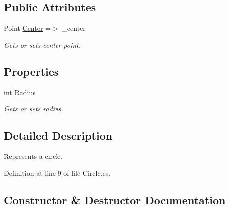 \subsection*{Public Attributes}
\begin{DoxyCompactItemize}
\item 
Point \mbox{\hyperlink{class_test_project_1_1_task_library_1_1_tasks_1_1_lesson6_1_1_models_1_1_circle_a459f59c96a830851a5a17e1efb26197d}{Center}} =$>$ \+\_\+center
\begin{DoxyCompactList}\small\item\em Gets or sets center point. \end{DoxyCompactList}\end{DoxyCompactItemize}
\subsection*{Properties}
\begin{DoxyCompactItemize}
\item 
int \mbox{\hyperlink{class_test_project_1_1_task_library_1_1_tasks_1_1_lesson6_1_1_models_1_1_circle_aaa90ca9c05259731fb2c3684b9feb3bd}{Radius}}
\begin{DoxyCompactList}\small\item\em Gets or sets radius. \end{DoxyCompactList}\end{DoxyCompactItemize}


\subsection{Detailed Description}
Represents a circle. 



Definition at line 9 of file Circle.\+cs.



\subsection{Constructor \& Destructor Documentation}
\mbox{\label{class_test_project_1_1_task_library_1_1_tasks_1_1_lesson6_1_1_models_1_1_circle_aa5a428622acc512fbf5ba682035530e2}} 
